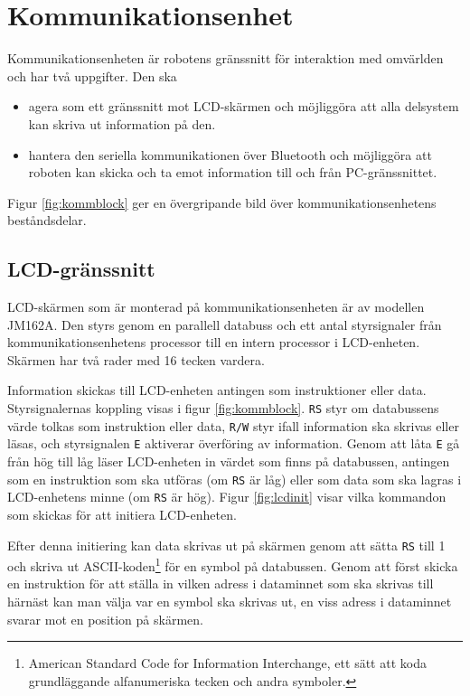 \section{Kommunikationsenhet}
Kommunikationsenheten är robotens gränssnitt för interaktion med omvärlden och har två uppgifter. Den ska
\begin{itemize}
\item agera som ett gränssnitt mot LCD-skärmen och möjliggöra att alla delsystem kan skriva ut information på den.
\item hantera den seriella kommunikationen över Bluetooth och möjliggöra att roboten kan skicka och ta emot information till och från PC-gränssnittet.
\end{itemize}

Figur \ref{fig:kommblock} ger en övergripande bild över kommunikationsenhetens beståndsdelar.


\subsection{LCD-gränssnitt}
LCD-skärmen som är monterad på kommunikationsenheten är av modellen JM162A. Den styrs genom en parallell databuss och ett antal styrsignaler från kommunikationsenhetens processor till en intern processor i LCD-enheten. Skärmen har två rader med 16 tecken vardera.

Information skickas till LCD-enheten antingen som instruktioner eller data. Styrsignalernas koppling visas i figur \ref{fig:kommblock}. \verb|RS| styr om databussens värde tolkas som instruktion eller data, \verb|R/W| styr ifall information ska skrivas eller läsas, och styrsignalen \verb|E| aktiverar överföring av information. Genom att låta \verb|E| gå från hög till låg läser LCD-enheten in värdet som finns på databussen, antingen som en instruktion som ska utföras (om \verb|RS| är låg) eller som data som ska lagras i LCD-enhetens minne (om \verb|RS| är hög). Figur \ref{fig:lcdinit} visar vilka kommandon som skickas för att initiera LCD-enheten.


Efter denna initiering kan data skrivas ut på skärmen genom att sätta \verb|RS| till 1 och skriva ut ASCII-koden\footnote{American Standard Code for Information Interchange, ett sätt att koda grundläggande alfanumeriska tecken och andra symboler.} för en symbol på databussen. Genom att först skicka en instruktion för att ställa in vilken adress i dataminnet som ska skrivas till härnäst kan man välja var en symbol ska skrivas ut, en viss adress i dataminnet svarar mot en position på skärmen.

